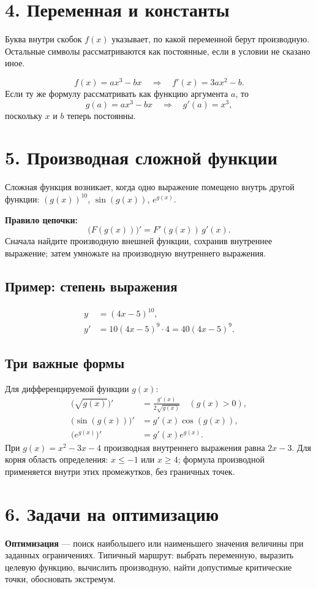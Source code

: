 \documentclass[a4paper,12pt]{article}
\newcommand{\term}[1]{\textcolor{darkaccent}{\textbf{#1}}}
\newcommand{\sect}[1]{\section*{\textcolor{darkaccent}{#1}}}
\newcommand{\subsect}[1]{\subsection*{\textcolor{accent}{#1}}}
\begin{document}
\sect{4. Переменная и константы}
Буква внутри скобок \(f(x)\) указывает, по какой переменной берут производную. Остальные символы рассматриваются как постоянные, если в условии не сказано иное.

\[
 f(x)=ax^3-bx\quad\Longrightarrow\quad f'(x)=3ax^2-b.
\]
Если ту же формулу рассматривать как функцию аргумента \(a\), то
\[
 g(a)=ax^3-bx\quad\Longrightarrow\quad g'(a)=x^3,
\]
поскольку \(x\) и \(b\) теперь постоянны.

\sect{5. Производная сложной функции}
Сложная функция возникает, когда одно выражение помещено внутрь другой функции: \((g(x))^{10}\), \(\sin(g(x))\), \(e^{g(x)}\).

\term{Правило цепочки:}
\[
\boxed{\bigl(F(g(x))\bigr)'=F'(g(x))\,g'(x)}.
\]
Сначала найдите производную внешней функции, сохранив внутреннее выражение; затем умножьте на производную внутреннего выражения.

\subsect{Пример: степень выражения}
\[
\begin{aligned}
 y&=(4x-5)^{10},\\
 y'&=10(4x-5)^9\cdot4=\boxed{40(4x-5)^9}.
\end{aligned}
\]

\subsect{Три важные формы}
Для дифференцируемой функции \(g(x)\):
\[
\begin{aligned}
 \bigl(\sqrt{g(x)}\bigr)'&=\frac{g'(x)}{2\sqrt{g(x)}}\quad (g(x)>0),\\
 \bigl(\sin(g(x))\bigr)'&=g'(x)\cos(g(x)),\\
 \bigl(e^{g(x)}\bigr)'&=g'(x)e^{g(x)}.
\end{aligned}
\]
При \(g(x)=x^2-3x-4\) производная внутреннего выражения равна \(2x-3\). Для корня область определения: \(x\le-1\) или \(x\ge4\); формула производной применяется внутри этих промежутков, без граничных точек.
\clearpage

\sect{6. Задачи на оптимизацию}
\term{Оптимизация} --- поиск наибольшего или наименьшего значения величины при заданных ограничениях. Типичный маршрут: выбрать переменную, выразить целевую функцию, вычислить производную, найти допустимые критические точки, обосновать экстремум.
\end{document}
